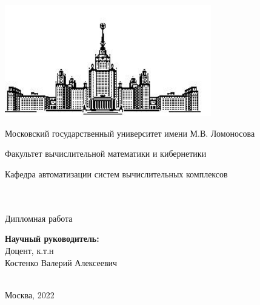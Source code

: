 \makeatletter
\begin{titlepage}
    \begin{center}
        \includegraphics[width=9cm]{imgs/msulogo.png}\\
        \small
        \centerline{Московский государственный университет имени М.В. Ломоносова}
        \centerline{Факультет вычислительной математики и кибернетики}
        \centerline{Кафедра автоматизации систем вычислительных комплексов}
        \centerline{}
        \Large
        \vfill
        {\@author}\\
        \null
        {\LARGE \bf
        \@title
        }\\
        \null \null
        {\large Дипломная работа}\\
        \null \null
    \end{center}
    \begin{flushright}
        {\bf Научный руководитель:}\\
        Доцент, к.т.н \\Костенко Валерий Алексеевич\\
        ~\\
        \vfill
    \end{flushright}
    \centerline{Москва, 2022}
\end{titlepage}
\setcounter{page}{2}
